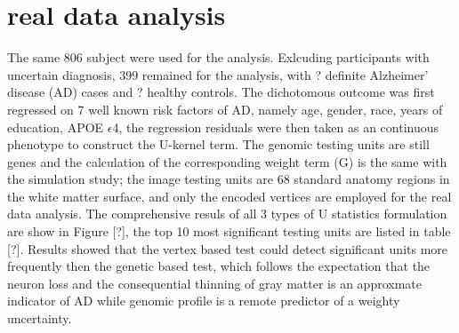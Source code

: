\documentclass[twocolumn]{article}
\begin{document}
\section{real data analysis}
The same 806 subject were used for the analysis. Exlcuding participants with uncertain diagnosis, 399 remained for the analysis, with ? definite Alzheimer' disease (AD) cases and ? healthy controls. The dichotomous outcome was first regressed on 7 well known risk factors of AD, namely age, gender, race, years of education, APOE $\epsilon$4, the regression residuals were then taken as an continuous phenotype to construct the U-kernel term. The genomic testing units are still genes and the calculation of the corresponding weight term (G) is the same with the simulation study; the image testing units are 68 standard anatomy regions in the white matter surface, and only the encoded vertices are employed for the real data analysis. The comprehensive resuls of all 3 types of U statistics formulation are show in Figure [?], the top 10 most significant testing units are listed in table [?]. Results showed that the vertex based test could detect significant units more frequently then the genetic based test, which follows the expectation that the neuron loss and the consequential thinning of gray matter is an approxmate indicator of AD while genomic profile is a remote predictor of a weighty uncertainty. 

\end{document}
